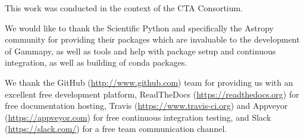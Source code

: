 \documentclass{PoS}
\newcommand{\url}[1]{\href{#1}{#1}}
\begin{document}
This work was conducted in the context of the CTA Consortium.

We would like to thank the Scientific Python and specifically the Astropy
community for providing their packages which are invaluable to the development
of Gammapy, as well as tools and help with package setup and continuous
integration, as well as building of conda packages.

We thank the GitHub (\url{http://www.github.com}) team for providing us with an
excellent free development platform, ReadTheDocs (\url{https://readthedocs.org})
for free documentation hosting, Travis (\url{https://www.travis-ci.org}) and
Appveyor (\url{https://appveyor.com}) for free continuous integration testing,
and Slack (\url{https://slack.com/}) for a free team communication channel.




\end{document}
